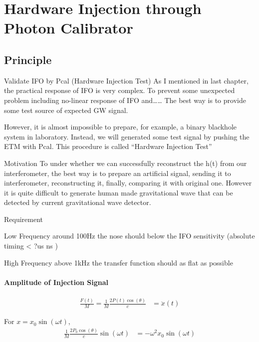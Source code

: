
\chapter{Hardware Injection through Photon Calibrator}
\section{Principle}
 


Validate IFO by Pcal (Hardware Injection Test)
As I mentioned in last chapter, the practical response of IFO is very complex. To prevent some unexpected problem including no-linear response of IFO and……  
The best way is to provide some test source of expected GW signal.

However, it is almost impossible to prepare, for example, a binary blackhole system in laboratory. Instead, we will generated some test signal by pushing the ETM with Pcal. This procedure is called “Hardware Injection Test”


Motivation
To under whether we can successfully reconstruct the h(t) from our interferometer, the best way is to prepare an artificial signal, sending it to interferometer, reconstructing it, finally, comparing it with original one. However it is quite difficult to generate human made gravitational wave that can be detected by current gravitational wave detector.

Requirement

Low Frequency
around 100Hz  the nose should below the IFO sensitivity
(absolute timing < ?us ns )

High Frequency
above 1kHz    the transfer function should as flat as possible


\subsubsection{Amplitude of Injection Signal}


\begin{align}
    \frac{F(t)}{M}=\frac{1}{M} \frac{2 P(t) \cos(\theta)}{c} &= \ddot{x}(t)
\end{align}

For $x=x_0 \sin(\omega t)$,
\begin{align}
    \frac{1}{M} \frac{2 P_0 \cos(\theta)}{c} \sin(\omega t) &=  -\omega^2 x_0 \sin(\omega t)
\end{align}

